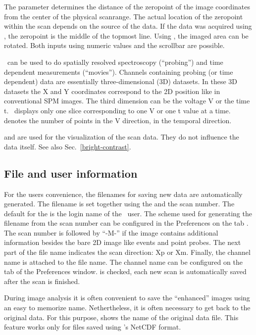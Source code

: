 The parameter  determines the distance of the zeropoint of the image coordinates from the center of the physical scanrange. The actual location of the zeropoint within the scan depends on the source of the data. If the data was acquired using \Gxsm, the zeropoint is the middle of the topmost line. Using , the imaged area can be rotated. Both inputs
using numeric values and the scrollbar are possible.

\Gxsm\ can be used to do spatially resolved spectroscopy (``probing'') and time dependent measurements (``movies''). Channels containing probing (or time dependent) data are essentially three-dimensional (3D) datasets. In these 3D datasets the X and Y coordinates correspond to the 2D position like in conventional SPM images. The third dimension can be the voltage V or the time t. \Gxsm\ displays only one slice corresponding to one V or one t value at a time.  denotes the number of points in the V direction,  in the temporal direction.

 and  are used for the visualization of the scan data. They do not influence the data itself. See also Sec.~\ref{bright-contrast}.

\subsection{File and user information}

For the users convenience, the filenames for saving new data are automatically generated. The filename is set together using the
 and the scan number. The default for the  is the login name of the \Gxsm\ user. The scheme used
for generating the filename from the scan number can be configured in the Preferences on the tab . The scan number is followed by ``-M-'' if the image contains additional information besides the bare 2D image like events and point probes. The next part of the file name indicates the scan direction: Xp or Xm. Finally, the channel name is attached to the file name. The channel name can be configured on the tab  of the Preferences window.  is checked, each new scan is automatically saved after the scan is finished.

During image analysis it is often convenient to save the ``enhanced'' images using an easy to memorize name. Nethertheless, it is often necessary to get back to the original data. For this purpose,  shows the name of the original data file. This feature works only for files saved using \Gxsm's NetCDF format.

